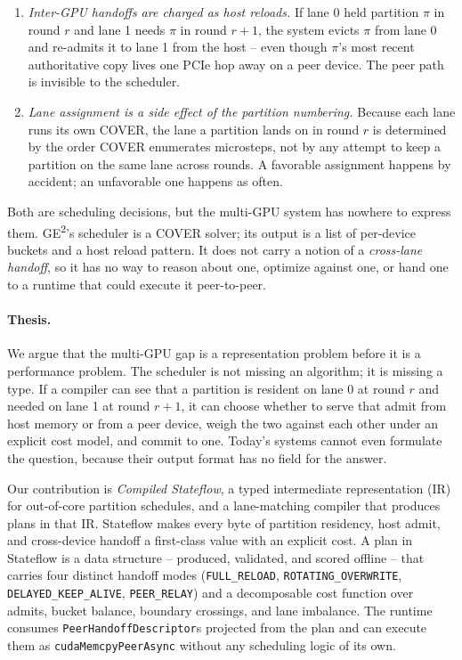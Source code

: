 \begin{enumerate}
\item \emph{Inter-GPU handoffs are charged as host reloads.} If lane
0 held partition $\pi$ in round $r$ and lane 1 needs $\pi$ in round
$r\!+\!1$, the system evicts $\pi$ from lane 0 and re-admits it to
lane 1 from the host -- even though $\pi$'s most recent authoritative
copy lives one PCIe hop away on a peer device. The peer path is
invisible to the scheduler.
\item \emph{Lane assignment is a side effect of the partition
numbering.} Because each lane runs its own COVER, the lane a
partition lands on in round $r$ is determined by the order COVER
enumerates microsteps, not by any attempt to keep a partition on the
same lane across rounds. A favorable assignment happens by accident;
an unfavorable one happens as often.
\end{enumerate}

Both are scheduling decisions, but the multi-GPU system has nowhere to
express them. GE\textsuperscript{2}'s scheduler is a COVER solver; its
output is a list of per-device buckets and a host reload pattern. It
does not carry a notion of a \emph{cross-lane handoff}, so it has no
way to reason about one, optimize against one, or hand one to a
runtime that could execute it peer-to-peer.

\paragraph{Thesis.}
We argue that the multi-GPU gap is a representation problem before it
is a performance problem. The scheduler is not missing an algorithm;
it is missing a type. If a compiler can see that a partition is
resident on lane 0 at round $r$ and needed on lane 1 at round $r\!+\!1$,
it can choose whether to serve that admit from host memory or from
a peer device, weigh the two against each other under an explicit
cost model, and commit to one. Today's systems cannot even formulate
the question, because their output format has no field for the
answer.

Our contribution is \emph{Compiled Stateflow}, a typed intermediate
representation (IR) for out-of-core partition schedules, and a
lane-matching compiler that produces plans in that IR. Stateflow
makes every byte of partition residency, host admit, and cross-device
handoff a first-class value with an explicit cost. A plan in
Stateflow is a data structure -- produced, validated, and scored
offline -- that carries four distinct handoff modes
(\texttt{FULL\_RELOAD}, \texttt{ROTATING\_OVERWRITE},
\texttt{DELAYED\_KEEP\_ALIVE}, \texttt{PEER\_RELAY}) and a
decomposable cost function over admits, bucket balance, boundary
crossings, and lane imbalance. The runtime consumes
\texttt{PeerHandoffDescriptor}s projected from the plan and can
execute them as \texttt{cudaMemcpyPeerAsync} without any scheduling
logic of its own.

